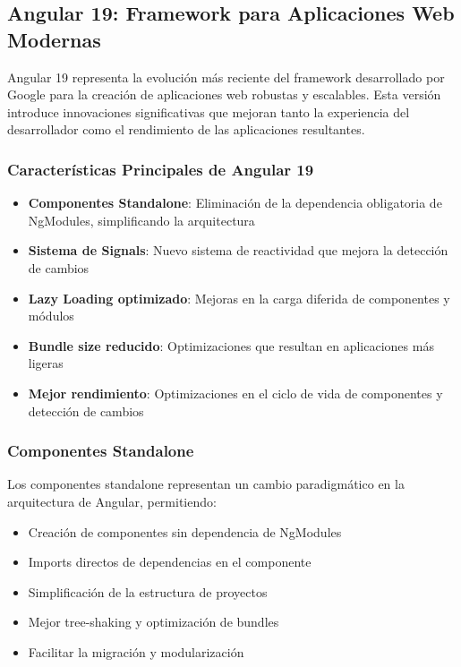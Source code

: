 \subsection{Angular 19: Framework para Aplicaciones Web Modernas}

Angular 19 representa la evolución más reciente del framework desarrollado por Google para la creación de aplicaciones web robustas y escalables. Esta versión introduce innovaciones significativas que mejoran tanto la experiencia del desarrollador como el rendimiento de las aplicaciones resultantes.

\subsubsection{Características Principales de Angular 19}

\begin{itemize}
    \item \textbf{Componentes Standalone}: Eliminación de la dependencia obligatoria de NgModules, simplificando la arquitectura
    \item \textbf{Sistema de Signals}: Nuevo sistema de reactividad que mejora la detección de cambios
    \item \textbf{Lazy Loading optimizado}: Mejoras en la carga diferida de componentes y módulos
    \item \textbf{Bundle size reducido}: Optimizaciones que resultan en aplicaciones más ligeras
    \item \textbf{Mejor rendimiento}: Optimizaciones en el ciclo de vida de componentes y detección de cambios
\end{itemize}

\subsubsection{Componentes Standalone}

Los componentes standalone representan un cambio paradigmático en la arquitectura de Angular, permitiendo:

\begin{itemize}
    \item Creación de componentes sin dependencia de NgModules
    \item Imports directos de dependencias en el componente
    \item Simplificación de la estructura de proyectos
    \item Mejor tree-shaking y optimización de bundles
    \item Facilitar la migración y modularización
\end{itemize}

